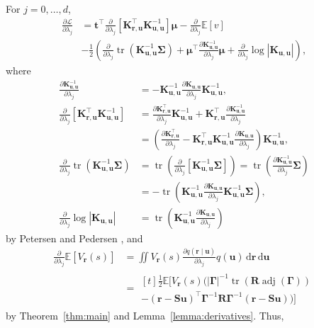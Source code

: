 \documentclass{mpaper}
\DeclareMathOperator{\adj}{adj}
\DeclareMathOperator{\tr}{tr}
\newcommand{\V}{V_{\mathbf{r}}}
\newcommand{\dx}{\,\mathrm{d}\mathbf{r}\,\mathrm{d}\mathbf{u}}
\newcommand{\Kuu}{\mathbf{K}_{\mathbf{u},\mathbf{u}}}
\newcommand{\Kru}{\mathbf{K}_{\mathbf{r},\mathbf{u}}}
\newcommand{\dlj}{\frac{\partial}{\partial \lambda_j}}
\begin{document}
For $j = 0, \dots, d$,
\[
  \begin{split}
    \frac{\partial \mathcal{L}}{\partial \lambda_j} &= \mathbf{t}^\intercal\dlj
    \left[ \Kru^\intercal\Kuu^{-1} \right] \bm\mu - \dlj\mathbb{E}[v] \\
    &- \frac{1}{2} \left(\dlj \tr \left(\Kuu^{-1}\bm\Sigma \right) +
      \bm\mu^\intercal \frac{\partial \Kuu^{-1}}{\partial \lambda_j} \bm\mu +
      \dlj \log |\Kuu| \right),
  \end{split}
\]
where
\begin{align*}
  \frac{\partial \Kuu^{-1}}{\partial \lambda_j} &= -\Kuu^{-1}\frac{\partial \Kuu}{\partial \lambda_j}\Kuu^{-1}, \\
  \dlj \left[ \Kru^\intercal\Kuu^{-1} \right] &= \frac{\partial \Kru^\intercal}{\partial \lambda_j} \Kuu^{-1} + \Kru^\intercal \frac{\partial \Kuu^{-1}}{\partial \lambda_j} \\
                                                &= \left( \frac{\partial \Kru^\intercal}{\partial \lambda_j} - \Kru^\intercal\Kuu^{-1}\frac{\partial \Kuu}{\partial \lambda_j} \right) \Kuu^{-1}, \\
  \dlj \tr(\Kuu^{-1}\bm\Sigma) &= \tr \left( \dlj \left[ \Kuu^{-1}\bm\Sigma \right] \right) = \tr \left( \frac{\partial \Kuu^{-1}}{\partial \lambda_j} \bm\Sigma \right) \\
                                                &= -\tr \left( \Kuu^{-1} \frac{\partial \Kuu}{\partial \lambda_j} \Kuu^{-1} \bm\Sigma \right), \\
  \dlj\log|\Kuu| &= \tr \left( \Kuu^{-1} \frac{\partial \Kuu}{\partial \lambda_j} \right)
\end{align*}
by Petersen and Pedersen \cite{petersen2008matrix}, and
\[
  \begin{split}
    \dlj \mathbb{E}[\V(s)] &= \iint\V(s)\frac{\partial q(\mathbf{r} \mid
      \mathbf{u})}{\partial \lambda_j}q(\mathbf{u})\dx \\
    &= \!\begin{multlined}[t]
      \frac{1}{2}\mathbb{E}[\V(s) (|\bm\Gamma|^{-1} \tr(\mathbf{R}
          \adj(\bm\Gamma)) \\
          - (\mathbf{r} -
          \mathbf{Su})^\intercal\bm\Gamma^{-1}\mathbf{R}\bm\Gamma^{-1}(\mathbf{r}
          - \mathbf{Su}))]
    \end{multlined}
  \end{split}
\]
by Theorem~\ref{thm:main} and Lemma~\ref{lemma:derivatives}. Thus,
\end{document}
